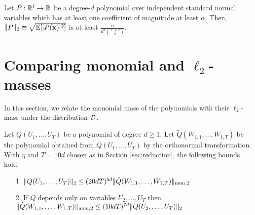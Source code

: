\begin{fact}\label{fact:hermite}
Let $P: {\mathbb{R}}^\ell \to {\ensuremath{\mathbb{R}}}$ be a degree-$d$ polynomial over independent standard normal variables which has at least one coefficient of magnitude at least $\alpha$. Then, $\|P\|_2 \equiv \sqrt{\E[|P({\bf x})|^2]}$ is at least $\frac{\alpha}{d^d {\ell + d \choose d}}$. 
\end{fact}



\section{Comparing monomial and $\ell_2$-masses}\label{sec-useful-appendix2}

In this section, we relate the monomial mass of the polynomials with their $\ell_2$-mass under the distribution $\mathcal{D}$.


\begin{lemma}				\label{lem:coeff_bounds}
	Let $Q(U_1,\ldots,U_T)$ be a polynomial of degree $d \ge 1$. Let $\tilde{Q}(W_{1,1},\ldots,W_{1,T})$ be the polynomial obtained from $Q(U_1,\ldots,U_T)$ by the orthonormal transformation. With $\eta$ and $T = 10d$ chosen as in Section \ref{sec:reduction}, the following bounds hold:
	
	\begin{itemize}
		\item[1.] $\|Q(U_1,\ldots,U_T)\|_2 \le (20dT)^{5d}\|\tilde{Q}(W_{1,1},\ldots,W_{1,T})\|_{\rm mon,2}$		
		\item[2.] If $Q$ depends only on variables $U_2,\ldots,U_T$ then $\|\tilde{Q}(W_{1,1},\ldots,W_{1,T})\|_{\rm mon,2} \le (10dT)^{7d}\|Q(U_2,\ldots,U_T)\|_2$
	\end{itemize}
\end{lemma}

